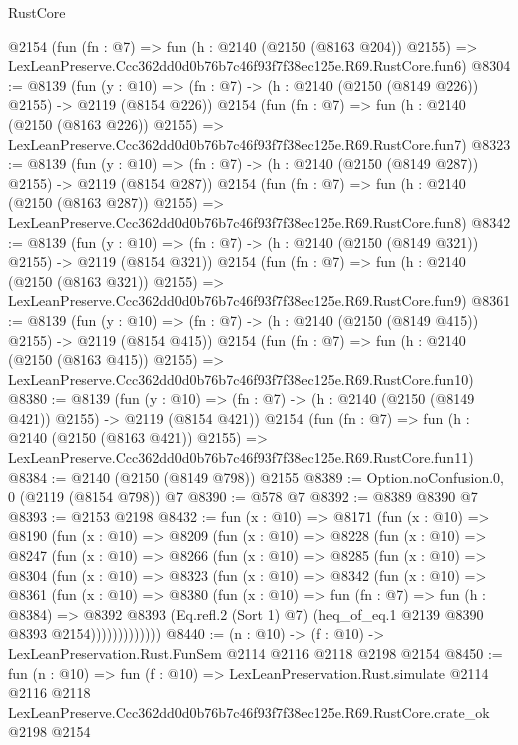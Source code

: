 \begin{lexlean}{RustCore}
\begin{coremodule}
    @2154
    (fun (fn : @7) =>
    fun (h : @2140 (@2150 (@8163 @204)) @2155) =>
    LexLeanPreserve.Ccc362dd0d0b76b7c46f93f7f38ec125e.R69.RustCore.fun6)
@8304 := @8139
    (fun (y : @10) => (fn : @7) -> (h : @2140 (@2150 (@8149 @226)) @2155) -> @2119 (@8154 @226))
    @2154
    (fun (fn : @7) =>
    fun (h : @2140 (@2150 (@8163 @226)) @2155) =>
    LexLeanPreserve.Ccc362dd0d0b76b7c46f93f7f38ec125e.R69.RustCore.fun7)
@8323 := @8139
    (fun (y : @10) => (fn : @7) -> (h : @2140 (@2150 (@8149 @287)) @2155) -> @2119 (@8154 @287))
    @2154
    (fun (fn : @7) =>
    fun (h : @2140 (@2150 (@8163 @287)) @2155) =>
    LexLeanPreserve.Ccc362dd0d0b76b7c46f93f7f38ec125e.R69.RustCore.fun8)
@8342 := @8139
    (fun (y : @10) => (fn : @7) -> (h : @2140 (@2150 (@8149 @321)) @2155) -> @2119 (@8154 @321))
    @2154
    (fun (fn : @7) =>
    fun (h : @2140 (@2150 (@8163 @321)) @2155) =>
    LexLeanPreserve.Ccc362dd0d0b76b7c46f93f7f38ec125e.R69.RustCore.fun9)
@8361 := @8139
    (fun (y : @10) => (fn : @7) -> (h : @2140 (@2150 (@8149 @415)) @2155) -> @2119 (@8154 @415))
    @2154
    (fun (fn : @7) =>
    fun (h : @2140 (@2150 (@8163 @415)) @2155) =>
    LexLeanPreserve.Ccc362dd0d0b76b7c46f93f7f38ec125e.R69.RustCore.fun10)
@8380 := @8139
    (fun (y : @10) => (fn : @7) -> (h : @2140 (@2150 (@8149 @421)) @2155) -> @2119 (@8154 @421))
    @2154
    (fun (fn : @7) =>
    fun (h : @2140 (@2150 (@8163 @421)) @2155) =>
    LexLeanPreserve.Ccc362dd0d0b76b7c46f93f7f38ec125e.R69.RustCore.fun11)
@8384 := @2140 (@2150 (@8149 @798)) @2155
@8389 := Option.noConfusion.{0, 0} (@2119 (@8154 @798)) @7
@8390 := @578 @7
@8392 := @8389 @8390 @7
@8393 := @2153 @2198
@8432 := fun (x : @10) =>
  @8171
    (fun (x : @10) =>
    @8190
      (fun (x : @10) =>
      @8209
        (fun (x : @10) =>
        @8228
          (fun (x : @10) =>
          @8247
            (fun (x : @10) =>
            @8266
              (fun (x : @10) =>
              @8285
                (fun (x : @10) =>
                @8304
                  (fun (x : @10) =>
                  @8323
                    (fun (x : @10) =>
                    @8342
                      (fun (x : @10) =>
                      @8361
                        (fun (x : @10) =>
                        @8380
                          (fun (x : @10) =>
                          fun (fn : @7) =>
                          fun (h : @8384) =>
                          @8392
                            @8393
                            (Eq.refl.{2} (Sort 1) @7)
                            (heq_of_eq.{1} @2139 @8390 @8393 @2154)))))))))))))
@8440 := (n : @10) -> (f : @10) -> LexLeanPreservation.Rust.FunSem @2114 @2116 @2118 @2198 @2154
@8450 := fun (n : @10) =>
  fun (f : @10) =>
  LexLeanPreservation.Rust.simulate
    @2114
    @2116
    @2118
    LexLeanPreserve.Ccc362dd0d0b76b7c46f93f7f38ec125e.R69.RustCore.crate_ok
    @2198
    @2154
\end{coremodule}
\end{lexlean}
